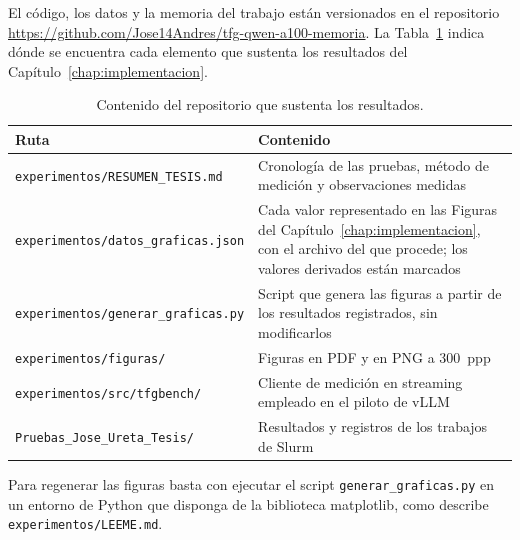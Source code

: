 
El código, los datos y la memoria del trabajo están versionados en el repositorio \url{https://github.com/Jose14Andres/tfg-qwen-a100-memoria}. La Tabla~\ref{tab:anexoA:contenido} indica dónde se encuentra cada elemento que sustenta los resultados del Capítulo~\ref{chap:implementacion}.

\begin{table}[htbp]
  \centering
  \caption{Contenido del repositorio que sustenta los resultados.}
  \label{tab:anexoA:contenido}
  \footnotesize
  \begin{tabular}{|p{}|p{}|}
    \hline
    \textbf{Ruta} & \textbf{Contenido} \\
    \hline
    \texttt{experimentos/\allowbreak RESUMEN\_TESIS.md} & Cronología de las pruebas, método de medición y observaciones medidas \\
    \hline
    \texttt{experimentos/\allowbreak datos\_graficas.json} & Cada valor representado en las Figuras del Capítulo~\ref{chap:implementacion}, con el archivo del que procede; los valores derivados están marcados \\
    \hline
    \texttt{experimentos/\allowbreak generar\_graficas.py} & Script que genera las figuras a partir de los resultados registrados, sin modificarlos \\
    \hline
    \texttt{experimentos/figuras/} & Figuras en PDF y en PNG a 300~ppp \\
    \hline
    \texttt{experimentos/\allowbreak src/tfgbench/} & Cliente de medición en streaming empleado en el piloto de vLLM \\
    \hline
    \texttt{Pruebas\_Jose\_Ureta\_Tesis/} & Resultados y registros de los trabajos de Slurm \\
    \hline
  \end{tabular}
\end{table}

Para regenerar las figuras basta con ejecutar el script \texttt{generar\_graficas.py} en un entorno de Python que disponga de la biblioteca matplotlib, como describe \texttt{experimentos/LEEME.md}.
